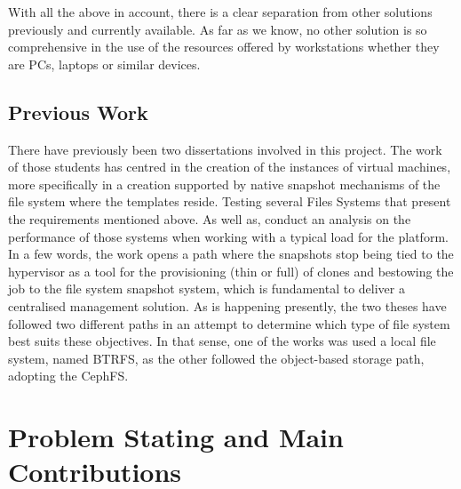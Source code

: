 With all the above in account, there is a clear separation from other solutions previously and currently available. As far as we know, no other solution is so comprehensive in the use of the resources offered by workstations whether they are PCs, laptops or similar devices.
\newpage


\subsection{Previous Work} %
\label{sub:intro_previous_work}

There have previously been two dissertations involved in this project. The work of those students has centred in the creation of the instances of virtual machines, more specifically in a creation supported by native snapshot mechanisms of the file system where the templates reside. Testing several Files Systems that present the requirements mentioned above. As well as, conduct an analysis on the performance of those systems when working with a typical load for the platform. 
In a few words, the work opens a path where the snapshots stop being tied to the hypervisor as a tool for the provisioning (thin or full) of clones and bestowing the job to the file system snapshot system, which is fundamental to deliver a centralised management solution.
As is happening presently, the two theses have followed two different paths in an attempt to determine which type of file system best suits these objectives. 
In that sense, one of the works was used a local file system, named BTRFS, as the other followed the object-based storage path, adopting the CephFS.



\section{Problem Stating and Main Contributions}
\label{sec:intro_project_contributions}

